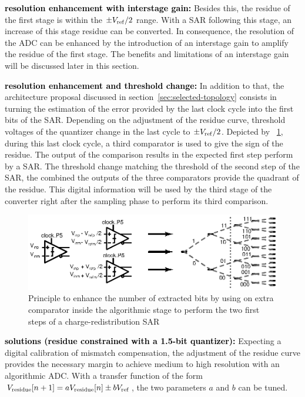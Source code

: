 \textbf{\textcolor{black}{resolution enhancement with interstage gain:}}
Besides this, the residue of the first stage is within the $\pm V_{\rm ref}/2$ range. With a SAR following this stage, an increase of this stage residue can be converted. In consequence, the resolution of the ADC can be enhanced by the introduction of an interstage gain to amplify the residue of the first stage. The benefits and limitations of an interstage gain will be discussed later in this section.

\textbf{\textcolor{black}{resolution enhancement and threshold change:}}
In addition to that, the architecture proposal discussed in section~\ref{sec:selected-topology} consists in turning the estimation of the error provided by the last clock cycle into the first bits of the SAR. Depending on the adjustment of the residue curve, threshold voltages of the quantizer change in the last cycle to \(\pm V_{\rm ref}/2\). Depicted by \figurename~\ref{fig:sar-first-bits-from-algo}, during this last clock cycle, a third comparator is used to give the sign of the residue. The output of the comparison results in the expected first step perform by a SAR\@. The threshold change matching the threshold of the second step of the SAR, the combined the outputs of the three comparators provide the quadrant of the residue. This digital information will be used by the third stage of the converter right after the sampling phase to perform its third comparison.

\begin{figure}[htp]
	\centering
	\includegraphics[width=\textwidth]{Chapter4/Figs/algo_sar_first_bits.ps}
	\caption{Principle to enhance the number of extracted bits by using on extra comparator inside the algorithmic stage to perform the two first steps of a charge-redistribution SAR}
	\label{fig:sar-first-bits-from-algo}
\end{figure}

\textbf{\textcolor{black}{solutions (residue constrained with a 1.5-bit quantizer):}}
Expecting a digital calibration of mismatch compensation, the adjustment of the residue curve provides the necessary margin to achieve medium to high resolution with an algorithmic ADC\@. With a transfer function of the form $V_{\rm residue}[n+1] = a V_{\rm residue}[n] \pm b V_{\rm ref}$, the two parameters $a$ and $b$ can be tuned.

